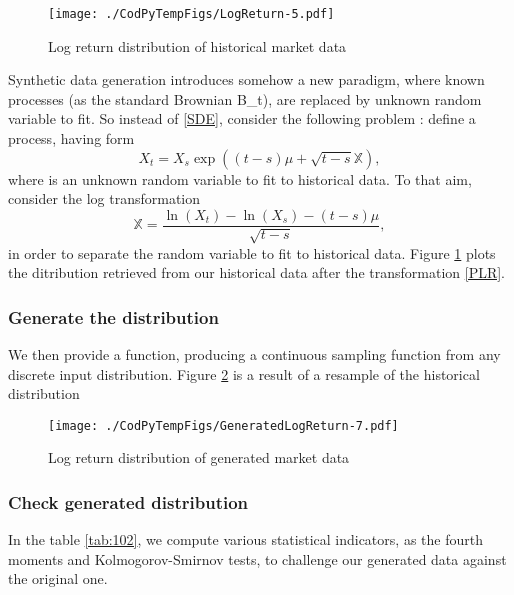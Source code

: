 \documentclass[
]{article}
\def\({}%
\def\){}%
\numberwithin{equation}{section}
\begin{document}
\begin{figure}
\centering
\texttt{[image: ./CodPyTempFigs/LogReturn-5.pdf]}
\caption{\label{plot4} Log return distribution of historical market
data}
\end{figure}

Synthetic data generation introduces somehow a new paradigm, where known
processes (as the standard Brownian \(B_t\)), are replaced by unknown
random variable to fit. So instead of \eqref{SDE}, consider the
following problem : define a process, having form
\begin{equation}\label{PLR}
  X_t = X_s \exp( (t-s) \mu + \sqrt{t-s} \mathbb{X}),
\end{equation} where \(\) is an unknown random variable to fit
to historical data. To that aim, consider the log transformation
\begin{equation}\label{LOG}
  \mathbb{X} = \frac{\ln(X_t) - \ln(X_s) - (t-s) \mu}{\sqrt{t-s}},
\end{equation} in order to separate the random variable \(\)
to fit to historical data. Figure \ref{plot4} plots the ditribution
retrieved from our historical data after the transformation \eqref{PLR}.

\newpage

\hypertarget{generate-the-distribution}{%
\subsubsection{Generate the
distribution}\label{generate-the-distribution}}

We then provide a function, producing a continuous sampling function
from any discrete input distribution. Figure \ref{plot5} is a result of
a resample of the historical distribution

\begin{figure}
\centering
\texttt{[image: ./CodPyTempFigs/GeneratedLogReturn-7.pdf]}
\caption{\label{plot5} Log return distribution of generated market data}
\end{figure}

\hypertarget{check-generated-distribution}{%
\subsubsection{Check generated
distribution}\label{check-generated-distribution}}

In the table \ref{tab:102}, we compute various statistical indicators,
as the fourth moments and Kolmogorov-Smirnov tests, to challenge our
generated data against the original one.
\end{document}
